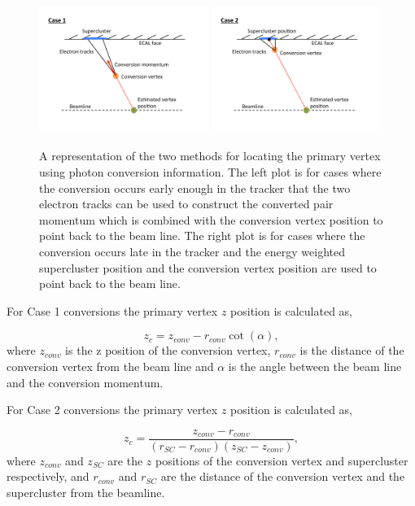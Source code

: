 \begin{figure}
  \includegraphics[width=0.49\textwidth]{analysis_comps/plots/ConversionDiagCase1.pdf}
  \includegraphics[width=0.49\textwidth]{analysis_comps/plots/ConversionDiagCase2.pdf}
  \caption{A representation of the two methods for locating the primary vertex using photon conversion information. The left plot is for cases where the conversion occurs early enough in the tracker that the two electron tracks can be used to construct the converted pair momentum which is combined with the conversion vertex position to point back to the beam line. The right plot is for cases where the conversion occurs late in the tracker and the energy weighted supercluster position and the conversion vertex position are used to point back to the beam line.}
  \label{fig:conv_diags}
\end{figure}

For Case 1 conversions the primary vertex $z$ position is calculated as,

\begin{equation}
  z_{c} = z_{conv} - r_{conv}\cot(\alpha),
\end{equation}
where $z_{conv}$ is the z position of the conversion vertex, $r_{conv}$ is the distance of the conversion vertex from the beam line and $\alpha$ is the angle between the beam line and the conversion momentum.

For Case 2 conversions the primary vertex $z$ position is calculated as,

\begin{equation}
  z_{c} = \frac{z_{conv}-r_{conv}}{(r_{SC}-r_{conv})(z_{SC}-z_{conv})},
\end{equation}
where $z_{conv}$ and $z_{SC}$ are the $z$ positions of the conversion vertex and supercluster respectively, and $r_{conv}$ and $r_{SC}$ are the distance of the conversion vertex and the supercluster from the beamline.

